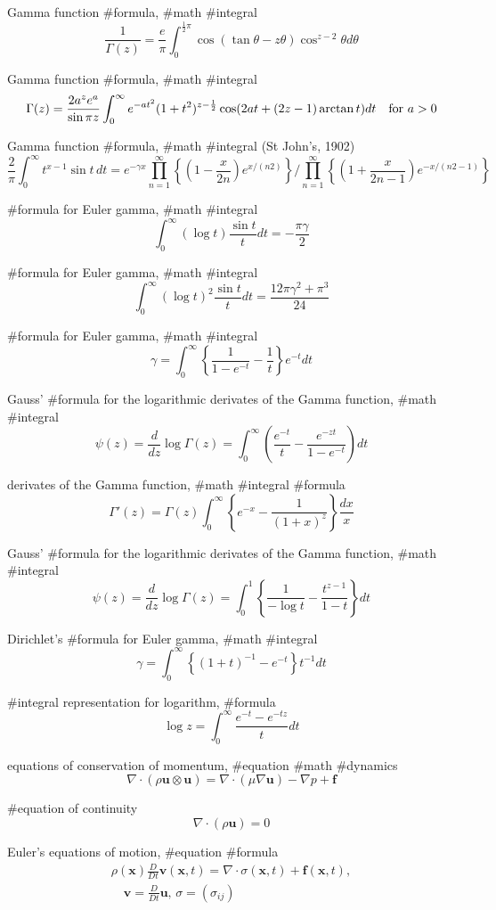 Gamma function #formula, #math #integral 
$$
\frac{1}{\Gamma(z)}=\frac{e}{\pi}\int^{\frac{1}{2}\pi}_0 \cos(\tan\theta-z\theta)\cos^{z-2}\theta d\theta
$$

Gamma function #formula, #math #integral 
$$
\Gamma(z)=\frac{2a^z e^a}{\sin\pi z}\int^\infty_0 e^{-at^2}(1+t^2)^{z-\frac{1}{2}} \cos(2at+(2z-1)\arctan t) dt \quad {\rm for}\,\,a>0
$$

Gamma function #formula, #math #integral (St John’s, 1902) 
$$
\frac{2}{\pi}\int^\infty_0 t^{x-1}\sin t\, dt=e^{-\gamma x}\prod^\infty_{n=1}\left\{\left(1-\frac{x}{2n}\right)e^{x/(n2)}\right\} \bigg / \prod^\infty_{n=1}\left\{\left(1+\frac{x}{2n-1}\right)e^{-x/(n2-1)}\right\}
$$

#formula for Euler gamma, #math #integral
$$
\int^\infty_0 (\log t)\frac{\sin t}{t} dt=-\frac{\pi \gamma}{2}
$$

#formula for Euler gamma, #math #integral
$$
\int^\infty_0 (\log t)^2 \frac{\sin t}{t} dt=\frac{12 \pi \gamma^2+\pi^3}{24}
$$

#formula for Euler gamma, #math #integral
$$
\gamma=\int^\infty_0 \left\{\frac{1}{1-e^{-t}}-\frac{1}{t}\right\}e^{-t}dt
$$

Gauss’ #formula for the logarithmic derivates of the Gamma function, #math #integral
$$
\psi(z)=\frac{d}{dz}\log \Gamma(z)=\int^\infty_0 \left(\frac{e^{-t}}{t}-\frac{e^{-zt}}{1-e^{-t}}\right)dt
$$

derivates of the Gamma function, #math #integral #formula
$$
\Gamma'(z)=\Gamma(z)\int^\infty_0 \left\{e^{-x}-\frac{1}{(1+x)^z}\right\}\frac{dx}{x}
$$

Gauss’ #formula for the logarithmic derivates of the Gamma function, #math #integral
$$
\psi(z)=\frac{d}{dz}\log \Gamma(z)=\int^1_0 \left\{\frac{1}{-\log t}-\frac{t^{z-1}}{1-t}\right\}dt
$$

Dirichlet’s #formula for Euler gamma, #math #integral
$$
\gamma=\int^\infty_0\left\{(1+t)^{-1}-e^{-t}\right\}t^{-1}dt
$$

#integral representation for logarithm, #formula 
$$
\log z=\int^\infty_0 \frac{e^{-t}-e^{-tz}}{t}dt
$$

equations of conservation of momentum, #equation #math #dynamics
$$
\nabla\cdot(\rho{\boldsymbol u} \otimes {\boldsymbol u}) = \nabla \cdot (\mu \nabla{\boldsymbol u})-\nabla p+{\boldsymbol f}
$$

#equation of continuity
$$
\nabla\cdot(\rho{\boldsymbol u})=0
$$


Euler’s equations of motion, #equation #formula
$$
\begin{array}{l}
\displaystyle\rho({\boldsymbol x})\frac{D}{Dt}{\boldsymbol v}({\boldsymbol x},t)=\nabla\cdot\sigma({\boldsymbol x},t)+{\boldsymbol f}({\boldsymbol x},t), \\
\displaystyle \quad {\boldsymbol v}=\frac{D}{Dt}{\boldsymbol u}, \, \sigma=(\sigma_{ij}) %
\end{array}
$$

